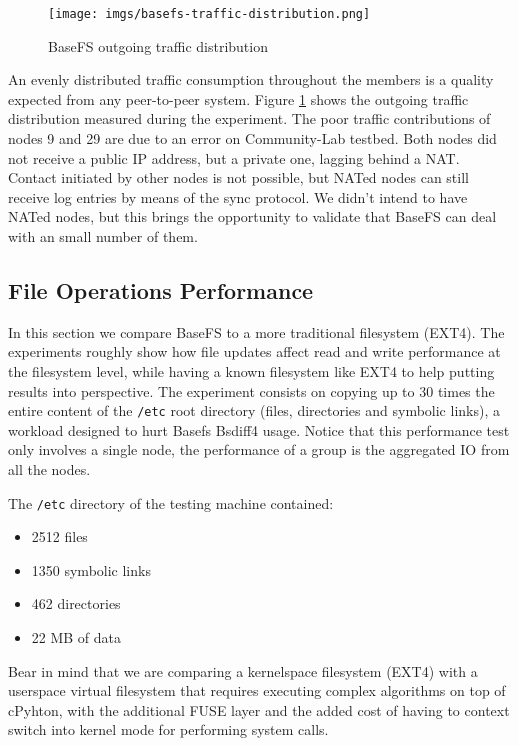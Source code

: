 \documentclass{sig-alternate}
\begin{document}
\begin{figure}
\centering
\texttt{[image: imgs/basefs-traffic-distribution.png]}
\caption{BaseFS outgoing traffic distribution}
\label{fig:basefs-traffic-distribution}
\end{figure}


An evenly distributed traffic consumption throughout the members is a quality expected from any peer-to-peer system. Figure \ref{fig:basefs-traffic-distribution} shows the outgoing traffic distribution measured during the experiment. The poor traffic contributions of nodes 9 and 29 are due to an error on Community-Lab testbed. Both nodes did not receive a public IP address, but a private one, lagging behind a NAT. Contact initiated by other nodes is not possible, but NATed nodes can still receive log entries by means of the sync protocol. We didn't intend to have NATed nodes, but this brings the opportunity to validate that BaseFS can deal with an small number of them. 



\subsection{File Operations Performance}
    
In this section we compare BaseFS to a more traditional filesystem (EXT4). The experiments roughly show how file updates affect read and write performance at the filesystem level, while having a known filesystem like EXT4 to help putting results into perspective. The experiment consists on copying up to 30 times the entire content of the \texttt{/etc} root directory (files, directories and symbolic links), a workload designed to hurt Basefs Bsdiff4 usage. Notice that this performance test only involves a single node, the performance of a group is the aggregated IO from all the nodes.

The \texttt{/etc} directory of the testing machine contained:

\begin{itemize}
 \item 2512 files
 \item 1350 symbolic links
 \item 462 directories
 \item 22 MB of data
\end{itemize}

Bear in mind that we are comparing a kernelspace filesystem (EXT4) with a userspace virtual filesystem that requires executing complex algorithms on top of cPyhton, with the additional FUSE layer and the added cost of having to context switch into kernel mode for performing system calls.
\end{document}
